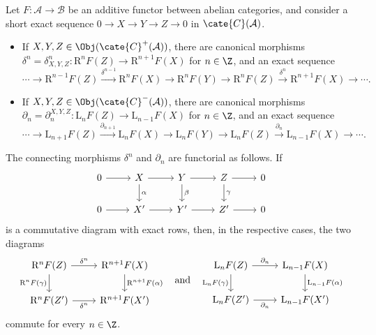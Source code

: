\begin{theorem}\label{prop:long-exact-sequence-primer}
	Let $F:\mathcal{A}\to\mathcal{B}$ be an additive functor between abelian
	categories, and consider a short exact sequence
	$0\to X\to Y\to Z\to0$ in $\cate{C}(\mathcal{A})$.
	\begin{itemize}
		\item If $X,Y,Z\in\Obj(\cate{C}^+(\mathcal{A}))$, there are canonical
		morphisms
		$\delta^n=\delta^n_{X,Y,Z}:\mathrm{R}^nF(Z)\to
		\mathrm{R}^{n+1}F(X)$ for $n\in\Z$, and an exact sequence
		\[ \cdots \to \mathrm{R}^{n-1} F(Z) \xrightarrow{\delta^{n-1}} \mathrm{R}^n F(X) \to \mathrm{R}^n F(Y) \to \mathrm{R}^n F(Z) \xrightarrow{\delta^n} \mathrm{R}^{n+1} F(X) \to \cdots . \]
		\item If $X,Y,Z\in\Obj(\cate{C}^-(\mathcal{A}))$, there are canonical
		morphisms
		$\partial_n=\partial_n^{X,Y,Z}:\mathrm{L}_nF(Z)\to
		\mathrm{L}_{n-1}F(X)$ for $n\in\Z$, and an exact sequence
		\[ \cdots \to \mathrm{L}_{n+1} F(Z) \xrightarrow{\partial_{n+1}} \mathrm{L}_n F(X) \to \mathrm{L}_n F(Y) \to \mathrm{L}_n F(Z) \xrightarrow{\partial_n} \mathrm{L}_{n-1} F(X) \to \cdots . \]
	\end{itemize}
	The connecting morphisms $\delta^n$ and $\partial_n$ are functorial as
	follows. If
	\[\begin{tikzcd}
		0 \arrow[r] & X \arrow[d, "\alpha"] \arrow[r] & Y \arrow[d, "\beta"] \arrow[r] & Z \arrow[d, "\gamma"] \arrow[r] & 0 \\
		0 \arrow[r] & X' \arrow[r] & Y' \arrow[r] & Z' \arrow[r] & 0
	\end{tikzcd}\]
	is a commutative diagram with exact rows, then, in the respective cases,
	the two diagrams
	\[\begin{tikzcd}
		\mathrm{R}^n F(Z) \arrow[r, "{\delta^n}"] \arrow[d, "{\mathrm{R}^n F(\gamma)}"'] & \mathrm{R}^{n+1} F(X) \arrow[d, "{\mathrm{R}^{n+1} F(\alpha)}"] \\
		\mathrm{R}^n F(Z') \arrow[r, "{\delta^n}"'] & \mathrm{R}^{n+1} F(X')
	\end{tikzcd} \quad \text{and} \quad
	\begin{tikzcd}
		\mathrm{L}_n F(Z) \arrow[r, "{\partial_n}"] \arrow[d, "{\mathrm{L}_n F(\gamma)}"'] & \mathrm{L}_{n-1} F(X) \arrow[d, "{\mathrm{L}_{n-1} F(\alpha)}"] \\
		\mathrm{L}_n F(Z') \arrow[r, "{\partial_n}"'] & \mathrm{L}_{n-1} F(X')
	\end{tikzcd}\]
	commute for every $n\in\Z$.
\end{theorem}
